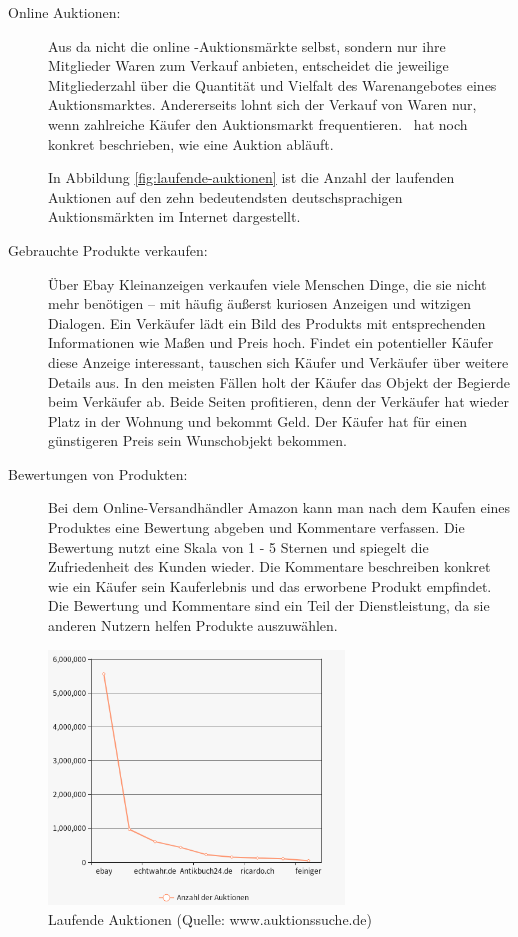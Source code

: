 \begin{description}
\item[Online Auktionen:] Aus \textcite[Kapitel 4: Wirtschaftliche Bedeutung von Ebay, S. 71]{hinneburg} \glqq da nicht die online -Auktionsmärkte selbst, sondern nur ihre Mitglieder Waren zum Verkauf anbieten, entscheidet die jeweilige Mitgliederzahl über die Quantität und Vielfalt des Warenangebotes eines Auktionsmarktes. Andererseits lohnt sich der Verkauf von Waren nur, wenn zahlreiche Käufer den Auktionsmarkt frequentieren.\grqq ~\textcite[S. 72]{hinneburg} hat noch konkret beschrieben, wie eine Auktion abläuft.

In Abbildung \vref{fig:laufende-auktionen} ist die Anzahl der laufenden Auktionen auf den zehn bedeutendsten deutschsprachigen Auktionsmärkten im Internet dargestellt.

\item[Gebrauchte Produkte verkaufen: ] Über Ebay Kleinanzeigen verkaufen viele Menschen Dinge, die sie nicht mehr benötigen – mit häufig äußerst kuriosen Anzeigen und witzigen Dialogen. Ein Verkäufer lädt ein Bild des Produkts mit entsprechenden Informationen wie Maßen und Preis hoch. Findet ein potentieller Käufer diese Anzeige interessant, tauschen sich Käufer und Verkäufer über weitere Details aus. In den meisten Fällen holt der Käufer das Objekt der Begierde beim Verkäufer ab. Beide Seiten profitieren, denn der Verkäufer hat wieder Platz in der Wohnung und bekommt Geld. Der Käufer hat für einen günstigeren Preis sein Wunschobjekt bekommen.

\item[Bewertungen von Produkten: ] Bei dem Online-Versandhändler Amazon kann man nach dem Kaufen eines Produktes eine Bewertung abgeben und Kommentare verfassen. Die Bewertung nutzt eine Skala von 1 - 5 Sternen und spiegelt die Zufriedenheit des Kunden wieder. Die Kommentare beschreiben konkret wie ein Käufer sein Kauferlebnis und das erworbene Produkt empfindet. Die Bewertung und Kommentare sind ein Teil der Dienstleistung, da sie anderen Nutzern helfen Produkte auszuwählen.
\end{description}

\begin{figure}
	\centering
	\includegraphics[width=0.7\textwidth]{bilder/laufende-auktionen.png}
	\caption[Laufende Auktionen]{Laufende Auktionen (Quelle: www.auktionssuche.de)}
	\label{fig:laufende-auktionen}
\end{figure}


